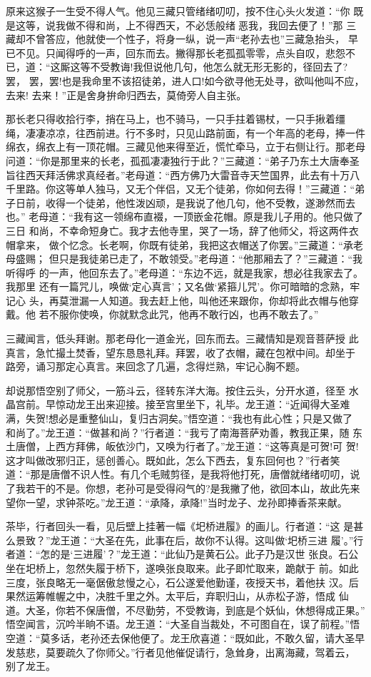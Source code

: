 原来这猴子一生受不得人气。他见三藏只管绪绪叨叨，按不住心头火发道：“你
既是这等，说我做不得和尚，上不得西天，不必恁般绪恶我，我回去便了！”那
三藏却不曾答应，他就使一个性子，将身一纵，说一声“老孙去也”三藏急抬头，
早已不见。只闻得呼的一声，回东而去。撇得那长老孤孤零零，点头自叹，悲怨不
已，道：“这厮这等不受教诲!我但说他几句，他怎么就无形无影的，径回去了?罢，
罢，罢!也是我命里不该招徒弟，进人口!如今欲寻他无处寻，欲叫他叫不应，去来!
去来！”正是舍身拚命归西去，莫倚旁人自主张。

那长老只得收拾行李，捎在马上，也不骑马，一只手拄着锡杖，一只手揪着缰
绳，凄凄凉凉，往西前进。行不多时，只见山路前面，有一个年高的老母，捧一件
绵衣，绵衣上有一顶花帽。三藏见他来得至近，慌忙牵马，立于右侧让行。那老母
问道：“你是那里来的长老，孤孤凄凄独行于此？”三藏道：“弟子乃东土大唐奉圣
旨往西天拜活佛求真经者。”老母道：“西方佛乃大雷音寺天竺国界，此去有十万八
千里路。你这等单人独马，又无个伴侣，又无个徒弟，你如何去得！”三藏道：“弟
子日前，收得一个徒弟，他性泼凶顽，是我说了他几句，他不受教，遂渺然而去也。”
老母道：“我有这一领绵布直裰，一顶嵌金花帽。原是我儿子用的。他只做了三日
和尚，不幸命短身亡。我才去他寺里，哭了一场，辞了他师父，将这两件衣帽拿来，
做个忆念。长老啊，你既有徒弟，我把这衣帽送了你罢。”三藏道：“承老母盛赐；
但只是我徒弟已走了，不敢领受。”老母道：“他那厢去了？”三藏道：“我听得呼
的一声，他回东去了。”老母道：“东边不远，就是我家，想必往我家去了。我那里
还有一篇咒儿，唤做‘定心真言’；又名做‘紧箍儿咒’。你可暗暗的念熟，牢记心
头，再莫泄漏一人知道。我去赶上他，叫他还来跟你，你却将此衣帽与他穿戴。他
若不服你使唤，你就默念此咒，他再不敢行凶，也再不敢去了。”

三藏闻言，低头拜谢。那老母化一道金光，回东而去。三藏情知是观音菩萨授
此真言，急忙撮土焚香，望东恳恳礼拜。拜罢，收了衣帽，藏在包袱中间。却坐于
路旁，诵习那定心真言。来回念了几遍，念得烂熟，牢记心胸不题。

却说那悟空别了师父，一筋斗云，径转东洋大海。按住云头，分开水道，径至
水晶宫前。早惊动龙王出来迎接。接至宫里坐下，礼毕。龙王道：“近闻得大圣难
满，失贺!想必是重整仙山，复归古洞矣。”悟空道：“我也有此心性；只是又做了
和尚了。”龙王道：“做甚和尚？”行者道：“我亏了南海菩萨劝善，教我正果，随
东土唐僧，上西方拜佛，皈依沙门，又唤为行者了。”龙王道：“这等真是可贺!可
贺!这才叫做改邪归正，惩创善心。既如此，怎么下西去，复东回何也？”行者笑
道：“那是唐僧不识人性。有几个毛贼剪径，是我将他打死，唐僧就绪绪叨叨，说
了我若干的不是。你想，老孙可是受得闷气的?是我撇了他，欲回本山，故此先来
望你一望，求钟茶吃。”龙王道：“承降，承降!”当时龙子、龙孙即捧香茶来献。

茶毕，行者回头一看，见后壁上挂著一幅《圯桥进履》的画儿。行者道：“这
是甚么景致？”龙王道：“大圣在先，此事在后，故你不认得。这叫做‘圯桥三进
履’。”行者道：“怎的是‘三进履’？”龙王道：“此仙乃是黄石公。此子乃是汉世
张良。石公坐在圯桥上，忽然失履于桥下，遂唤张良取来。此子即忙取来，跪献于
前。如此三度，张良略无一毫倨傲怠慢之心，石公遂爱他勤谨，夜授天书，着他扶
汉。后果然运筹帷幄之中，决胜千里之外。太平后，弃职归山，从赤松子游，悟成
仙道。大圣，你若不保唐僧，不尽勤劳，不受教诲，到底是个妖仙，休想得成正果。”
悟空闻言，沉吟半晌不语。龙王道：“大圣自当裁处，不可图自在，误了前程。”悟
空道：“莫多话，老孙还去保他便了。龙王欣喜道：“既如此，不敢久留，请大圣早
发慈悲，莫要疏久了你师父。”行者见他催促请行，急耸身，出离海藏，驾着云，
别了龙王。

